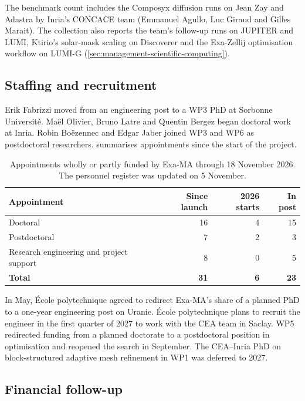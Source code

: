 The benchmark count includes the Composyx diffusion runs on Jean Zay
and Adastra by Inria's CONCACE team (Emmanuel Agullo, Luc Giraud and
Gilles Marait). The collection also reports the team's follow-up runs
on JUPITER and LUMI, Ktirio's solar-mask scaling on Discoverer and the
Exa-Zellij optimisation workflow on LUMI-G
(\cref{sec:management-scientific-computing}).

\subsection{Staffing and recruitment}

Erik Fabrizzi moved from an engineering post to a WP3 PhD at Sorbonne
Université. Maël Olivier, Bruno Latre and Quentin Bergez began doctoral
work at Inria. Robin Boëzennec and Edgar Jaber joined WP3 and WP6 as
postdoctoral researchers.
 summarises appointments since the
start of the project.

\begin{table}[!htb]
\centering
\caption{Appointments wholly or partly funded by Exa-MA through 18 November 2026. The personnel register was updated on 5 November.}
\label{tab:exama-staffing-2026}
\small
\begin{tabular}{@{}lrrr@{}}
\toprule
\textbf{Appointment} & \textbf{Since launch} & \textbf{2026 starts} & \textbf{In post}\\
\midrule
Doctoral & 16 & 4 & 15\\
Postdoctoral & 7 & 2 & 3\\
Research engineering and project support & 8 & 0 & 5\\
\midrule
\textbf{Total} & \textbf{31} & \textbf{6} & \textbf{23}\\
\bottomrule
\end{tabular}
\end{table}

In May, École polytechnique agreed to redirect Exa-MA's share of a
planned PhD to a one-year engineering post on Uranie. École
polytechnique plans to recruit the engineer in the first quarter of
2027 to work with the CEA team in Saclay. WP5 redirected funding from a
planned doctorate to a postdoctoral position in optimisation and
reopened the search in September. The CEA--Inria PhD on block-structured
adaptive mesh refinement in WP1 was deferred to 2027.

\subsection{Financial follow-up}

